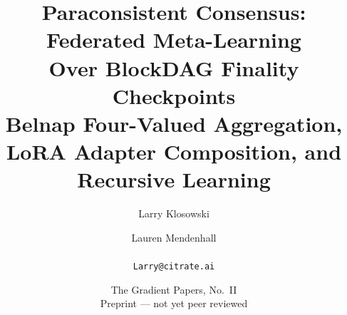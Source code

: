 

\title{\textbf{Paraconsistent Consensus: Federated Meta-Learning\\ Over BlockDAG Finality Checkpoints}\\[4pt]
\large Belnap Four-Valued Aggregation, LoRA Adapter Composition, and Recursive Learning}
\author{Larry Klosowski \and Lauren Mendenhall\\[2pt]\CitrateAffil\\ \texttt{Larry@citrate.ai}}
\date{The Gradient Papers, No.~II \\ Preprint --- not yet peer reviewed}


\maketitle


